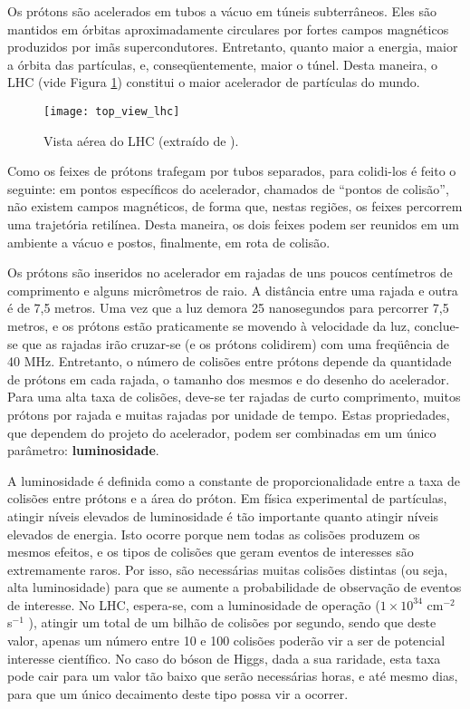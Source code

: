 Os prótons são acelerados em tubos a vácuo em túneis subterrâneos. Eles são mantidos em órbitas aproximadamente circulares por fortes campos magnéticos produzidos por imãs supercondutores. Entretanto, quanto maior a energia, maior a órbita das partículas, e, conseqüentemente, maior o túnel. Desta maneira, o LHC (vide Figura \ref{fig:vista_aerea_lhc}) constitui o maior acelerador de partículas do mundo.

\begin{figure}
\begin{center}
\texttt{[image: top\_view\_lhc]}
\caption[Vista aérea do LHC.]{Vista aérea do LHC (extraído de \cite{bib:site_lhc}).}
\label{fig:vista_aerea_lhc}
\end{center}
\end{figure}

Como os feixes de prótons trafegam por tubos separados, para colidi-los é feito o seguinte: em pontos específicos do acelerador, chamados de ``pontos de colisão'', não existem campos magnéticos, de forma que, nestas regiões, os feixes percorrem uma trajetória retilínea. Desta maneira, os dois feixes podem ser reunidos em um ambiente a vácuo e postos, finalmente, em rota de colisão.

Os prótons são inseridos no acelerador em rajadas de uns poucos centímetros de comprimento e alguns micrômetros de raio. A distância entre uma rajada e outra é de 7,5 metros. Uma vez que a luz demora 25 nanosegundos para percorrer 7,5 metros, e os prótons estão praticamente se movendo à velocidade da luz, conclue-se que as rajadas irão cruzar-se (e os prótons colidirem) com uma freqüência de 40 MHz. Entretanto, o número de colisões entre prótons depende da quantidade de prótons em cada rajada, o tamanho dos mesmos e do desenho do acelerador. Para uma alta taxa de
colisões, deve-se ter rajadas de curto comprimento, muitos prótons por rajada e muitas rajadas por unidade de tempo. Estas propriedades, que dependem do projeto do acelerador, podem ser combinadas em um único parâmetro: \textbf{luminosidade}.

A luminosidade é definida como a constante de proporcionalidade entre a taxa de colisões entre prótons e a área do próton. Em física experimental de partículas, atingir níveis elevados de luminosidade é tão importante quanto atingir níveis elevados de energia. Isto ocorre porque nem todas as colisões produzem os mesmos efeitos, e os tipos de colisões que geram eventos de interesses são extremamente raros. Por isso, são necessárias muitas colisões distintas (ou seja, alta luminosidade) para que se aumente a probabilidade de observação de eventos de interesse. No LHC, espera-se, com a luminosidade de operação ($1 \times 10^{34}$ cm$^{-2}$ s$^{-1}$ \cite{bib:tdaq_tdr}), atingir um total de um bilhão de colisões por segundo, sendo que deste valor, apenas um número entre 10 e 100 colisões poderão vir a ser de potencial interesse científico. No caso do bóson de Higgs, dada a sua raridade, esta taxa pode cair para um valor tão baixo que serão necessárias horas, e até mesmo dias, para que um único decaimento deste tipo possa vir a ocorrer.

